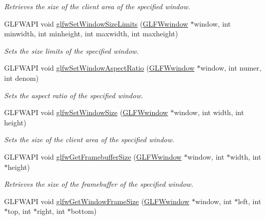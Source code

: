 \begin{DoxyCompactItemize}
\begin{DoxyCompactList}\small\item\em Retrieves the size of the client area of the specified window. \end{DoxyCompactList}\item 
G\+L\+F\+W\+A\+PI void \hyperlink{group__window_ga8af814fc98d786d1de2505b40b707de8}{glfw\+Set\+Window\+Size\+Limits} (\hyperlink{group__window_ga3c96d80d363e67d13a41b5d1821f3242}{G\+L\+F\+Wwindow} $\ast$window, int minwidth, int minheight, int maxwidth, int maxheight)
\begin{DoxyCompactList}\small\item\em Sets the size limits of the specified window. \end{DoxyCompactList}\item 
G\+L\+F\+W\+A\+PI void \hyperlink{group__window_gad2ae94a2c5ee1c46a36e13a8f4ac68ac}{glfw\+Set\+Window\+Aspect\+Ratio} (\hyperlink{group__window_ga3c96d80d363e67d13a41b5d1821f3242}{G\+L\+F\+Wwindow} $\ast$window, int numer, int denom)
\begin{DoxyCompactList}\small\item\em Sets the aspect ratio of the specified window. \end{DoxyCompactList}\item 
G\+L\+F\+W\+A\+PI void \hyperlink{group__window_gae54d1f4915ded15e267ddd3f41496cd2}{glfw\+Set\+Window\+Size} (\hyperlink{group__window_ga3c96d80d363e67d13a41b5d1821f3242}{G\+L\+F\+Wwindow} $\ast$window, int width, int height)
\begin{DoxyCompactList}\small\item\em Sets the size of the client area of the specified window. \end{DoxyCompactList}\item 
G\+L\+F\+W\+A\+PI void \hyperlink{group__window_gaf7d17f3534b4b6dc9a6f905e3a240b7e}{glfw\+Get\+Framebuffer\+Size} (\hyperlink{group__window_ga3c96d80d363e67d13a41b5d1821f3242}{G\+L\+F\+Wwindow} $\ast$window, int $\ast$width, int $\ast$height)
\begin{DoxyCompactList}\small\item\em Retrieves the size of the framebuffer of the specified window. \end{DoxyCompactList}\item 
G\+L\+F\+W\+A\+PI void \hyperlink{group__window_gaad46cdaae2eb732f68d3a1499a7c5409}{glfw\+Get\+Window\+Frame\+Size} (\hyperlink{group__window_ga3c96d80d363e67d13a41b5d1821f3242}{G\+L\+F\+Wwindow} $\ast$window, int $\ast$left, int $\ast$top, int $\ast$right, int $\ast$bottom)

\end{DoxyCompactItemize}
